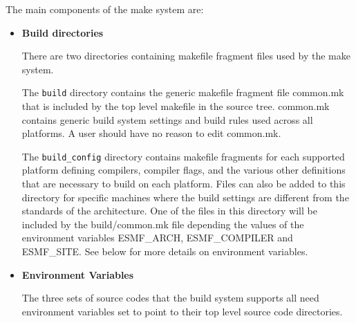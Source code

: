 The main components of the make system are:
\label{sec:BuildOptions}
\begin{itemize}
\item{{\bf Build directories}}

There are two directories containing makefile fragment files used by
the make system.  

The {\tt build} directory contains the generic makefile fragment file
common.mk that is included by the top level makefile in the source
tree.  common.mk contains generic build system settings and build
rules used across all platforms.  A user should have no reason to edit
common.mk.

The {\tt build\_config} directory contains makefile fragments for each
supported platform defining compilers, compiler flags, and the various
other definitions that are necessary to build on each platform.  Files
can also be added to this directory for specific machines where the
build settings are different from the standards of the architecture.
One of the files in this directory will be included by the
build/common.mk file depending the values of the environment variables
ESMF\_ARCH, ESMF\_COMPILER and ESMF\_SITE.  See below for more details
on environment variables.

\item{{\bf Environment Variables}}

The three sets of source codes that the build system supports all need
environment variables set to point to their top level source code
directories.

\end{itemize}
